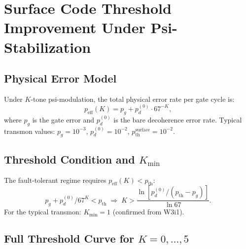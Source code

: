 \documentclass[11pt]{article}
\theoremstyle{definition}
\theoremstyle{remark}
\begin{document}
\section{Surface Code Threshold Improvement Under Psi-Stabilization}
\label{sec:surface-code}

\subsection{Physical Error Model}

Under $K$-tone psi-modulation, the total physical error rate per gate cycle is:
\begin{equation}
  p_{\mathrm{eff}}(K) = p_g + p_d^{(0)}\cdot 67^{-K},
\end{equation}
where $p_g$ is the gate error and $p_d^{(0)}$ is the bare decoherence error rate.
Typical transmon values: $p_g = 10^{-3}$, $p_d^{(0)} = 10^{-2}$,
$p_{\mathrm{th}}^{\mathrm{surface}} = 10^{-2}$.

\subsection{Threshold Condition and $K_{\min}$}

The fault-tolerant regime requires $p_{\mathrm{eff}}(K) < p_{\mathrm{th}}$:
\begin{equation}
  p_g + p_d^{(0)}/67^K < p_{\mathrm{th}}
  \;\Longrightarrow\;
  K > \frac{\ln[p_d^{(0)}/(p_{\mathrm{th}} - p_g)]}{\ln 67}.
\end{equation}
For the typical transmon: $K_{\min} = 1$ (confirmed from W3i1).

\subsection{Full Threshold Curve for $K = 0,\ldots,5$}
\end{document}
